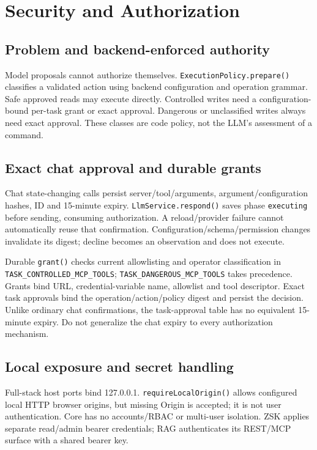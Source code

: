 \chapter{Security and Authorization}
\section{Problem and backend-enforced authority}
Model proposals cannot authorize themselves. \texttt{ExecutionPolicy.prepare()} classifies a validated action using backend configuration and operation grammar. Safe approved reads may execute directly. Controlled writes need a configuration-bound per-task grant or exact approval. Dangerous or unclassified writes always need exact approval. These classes are code policy, not the LLM's assessment of a command.
\section{Exact chat approval and durable grants}
Chat state-changing calls persist server/tool/arguments, argument/configuration hashes, ID and 15-minute expiry. \texttt{LlmService.respond()} saves phase \texttt{executing} before sending, consuming authorization. A reload/provider failure cannot automatically reuse that confirmation. Configuration/schema/permission changes invalidate its digest; decline becomes an observation and does not execute.

Durable \texttt{grant()} checks current allowlisting and operator classification in \texttt{TASK\_CONTROLLED\_MCP\_TOOLS}; \texttt{TASK\_DANGEROUS\_MCP\_TOOLS} takes precedence. Grants bind URL, credential-variable name, allowlist and tool descriptor. Exact task approvals bind the operation/action/policy digest and persist the decision. Unlike ordinary chat confirmations, the task-approval table has no equivalent 15-minute expiry. Do not generalize the chat expiry to every authorization mechanism.
\section{Local exposure and secret handling}
Full-stack host ports bind 127.0.0.1. \texttt{requireLocalOrigin()} allows configured local HTTP browser origins, but missing Origin is accepted; it is not user authentication. Core has no accounts/RBAC or multi-user isolation. ZSK applies separate read/admin bearer credentials; RAG authenticates its REST/MCP surface with a shared bearer key.

